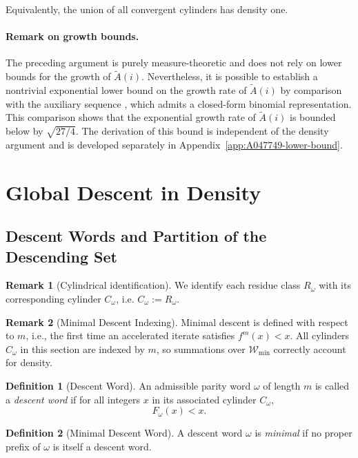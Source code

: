 \documentclass[12pt, oneside]{article}   	%
\numberwithin{equation}{section}          %
\theoremstyle{definition}
\newtheorem{define}{Definition}[section]
\newtheorem*{remark}{Remark}
\begin{document}
Equivalently, the union of all convergent cylinders has density one.

\paragraph{Remark on growth bounds.}
The preceding argument is purely measure-theoretic and does not rely on lower
bounds for the growth of \(\widetilde A(i)\). Nevertheless, it is possible to
establish a nontrivial exponential lower bound on the growth rate of
\(\widetilde A(i)\) by comparison with the auxiliary sequence ,
which admits a closed-form binomial representation. This comparison shows that
the exponential growth rate of \(\widetilde A(i)\) is bounded below by
\(\sqrt{27/4}\). The derivation of this bound is independent of the density
argument and is developed separately in Appendix~\ref{app:A047749-lower-bound}.


\section{Global Descent in Density}
\label{sec:global-descent}

\subsection{Descent Words and Partition of the Descending Set}

\begin{remark}[Cylindrical identification]
We identify each residue class \(R_\omega\) with its corresponding cylinder \(C_\omega\), i.e.
\(C_\omega := R_\omega\).
\end{remark}

\begin{remark}[Minimal Descent Indexing]
Minimal descent is defined with respect to $m$, i.e., the first time
an accelerated iterate satisfies $f^m(x) < x$. All cylinders $C_\omega$ in
this section are indexed by $m$, so summations over $\mathcal{W}_{\min}$
correctly account for density.
\end{remark}

\begin{define}[Descent Word]
An admissible parity word $\omega$ of length $m$ is called a \emph{descent word} if
for all integers $x$ in its associated cylinder $C_\omega$,
\[
F_\omega(x) < x.
\]
\end{define}

\begin{define}[Minimal Descent Word]
A descent word $\omega$ is \emph{minimal} if no proper prefix of $\omega$
is itself a descent word.
\end{define}
\end{document}
